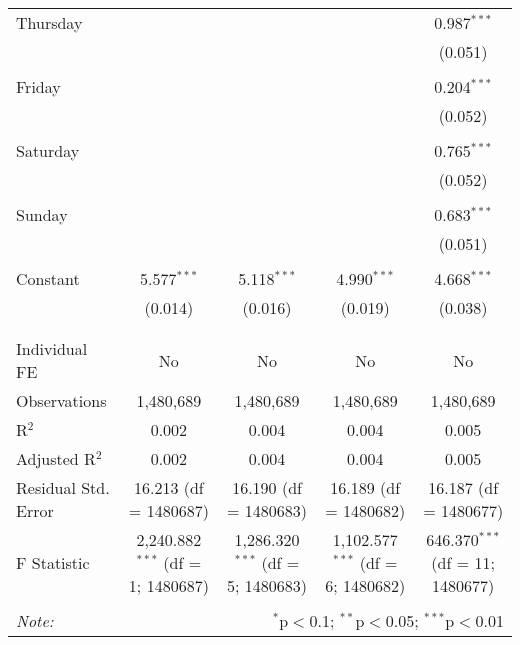 \documentclass[
]{article}
\begin{document}
\begin{table}[!htbp]
{\begin{tabular}{@{\extracolsep{5pt}}lcccc}
 Thursday &  &  &  & 0.987$^{***}$ \\ 
  &  &  &  & (0.051) \\ 
  & & & & \\ 
 Friday &  &  &  & 0.204$^{***}$ \\ 
  &  &  &  & (0.052) \\ 
  & & & & \\ 
 Saturday &  &  &  & 0.765$^{***}$ \\ 
  &  &  &  & (0.052) \\ 
  & & & & \\ 
 Sunday &  &  &  & 0.683$^{***}$ \\ 
  &  &  &  & (0.051) \\ 
  & & & & \\ 
 Constant & 5.577$^{***}$ & 5.118$^{***}$ & 4.990$^{***}$ & 4.668$^{***}$ \\ 
  & (0.014) & (0.016) & (0.019) & (0.038) \\ 
  & & & & \\ 
\hline \\[-1.8ex] 
Individual FE & No & No & No & No \\ 
Observations & 1,480,689 & 1,480,689 & 1,480,689 & 1,480,689 \\ 
R$^{2}$ & 0.002 & 0.004 & 0.004 & 0.005 \\ 
Adjusted R$^{2}$ & 0.002 & 0.004 & 0.004 & 0.005 \\ 
Residual Std. Error & 16.213 (df = 1480687) & 16.190 (df = 1480683) & 16.189 (df = 1480682) & 16.187 (df = 1480677) \\ 
F Statistic & 2,240.882$^{***}$ (df = 1; 1480687) & 1,286.320$^{***}$ (df = 5; 1480683) & 1,102.577$^{***}$ (df = 6; 1480682) & 646.370$^{***}$ (df = 11; 1480677) \\ 
\hline 
\hline \\[-1.8ex] 
\textit{Note:}  & \multicolumn{4}{r}{$^{*}$p$<$0.1; $^{**}$p$<$0.05; $^{***}$p$<$0.01} \\ 
\end{tabular}
} 
\end{table} 
\newpage
\end{document}
